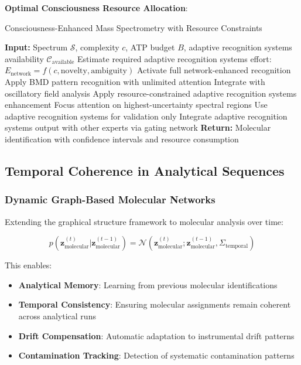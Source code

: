 \documentclass[11pt,a4paper]{article}
\theoremstyle{remark}
\begin{document}
\textbf{Optimal Consciousness Resource Allocation}:
\begin{algorithm}[H]
\caption{Consciousness-Enhanced Mass Spectrometry with Resource Constraints}
\begin{algorithmic}[1]
\State \textbf{Input:} Spectrum $\mathcal{S}$, complexity $c$, ATP budget $B$, adaptive recognition systems availability $\mathcal{C}_{\text{available}}$
\State Estimate required adaptive recognition systems effort: $E_{\text{network}} = f(c, \text{novelty}, \text{ambiguity})$
\State Activate full network-enhanced recognition
\State Apply BMD pattern recognition with unlimited attention
\State Integrate with oscillatory field analysis
\Else
\State Apply resource-constrained adaptive recognition systems enhancement
\State Focus attention on highest-uncertainty spectral regions
\State Use adaptive recognition systems for validation only
\EndIf
\State Integrate adaptive recognition systems output with other experts via gating network
\State \textbf{Return:} Molecular identification with confidence intervals and resource consumption
\end{algorithmic}
\end{algorithm}

\subsection{Temporal Coherence in Analytical Sequences}

\subsubsection{Dynamic Graph-Based Molecular Networks}

Extending the graphical structure framework to molecular analysis over time:

\begin{equation}
p(\mathbf{z}_{\text{molecular}}^{(t)} | \mathbf{z}_{\text{molecular}}^{(t-1)}) = \mathcal{N}(\mathbf{z}_{\text{molecular}}^{(t)}; \mathbf{z}_{\text{molecular}}^{(t-1)}, \Sigma_{\text{temporal}})
\end{equation}

This enables:
\begin{itemize}
\item \textbf{Analytical Memory}: Learning from previous molecular identifications
\item \textbf{Temporal Consistency}: Ensuring molecular assignments remain coherent across analytical runs
\item \textbf{Drift Compensation}: Automatic adaptation to instrumental drift patterns
\item \textbf{Contamination Tracking}: Detection of systematic contamination patterns
\end{itemize}
\end{document}
